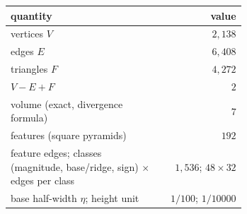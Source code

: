 \begin{tabular}{L{0.66\linewidth} r}
\toprule
quantity & value \\
\midrule
vertices $V$ & $2{,}138$ \\
edges $E$ & $6{,}408$ \\
triangles $F$ & $4{,}272$ \\
$V-E+F$ & $2$ \\
volume (exact, divergence formula) & $7$ \\
features (square pyramids) & $192$ \\
feature edges; classes (magnitude, base/ridge, sign) $\times$ edges per class & $1{,}536$; $48\times32$ \\
base half-width $\eta$; height unit & $1/100$; $1/10000$ \\
\bottomrule
\end{tabular}
